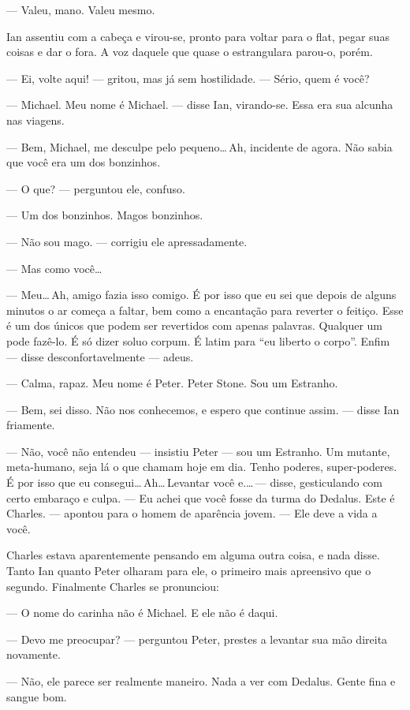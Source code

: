 --- Valeu, mano. Valeu mesmo.

Ian assentiu com a cabeça e virou-se, pronto para voltar para o flat,
pegar suas coisas e dar o fora. A voz daquele que quase o estrangulara
parou-o, porém.

--- Ei, volte aqui! --- gritou, mas já sem hostilidade. --- Sério, quem
é você?

--- Michael. Meu nome é Michael. --- disse Ian, virando-se. Essa era sua
alcunha nas viagens.

--- Bem, Michael, me desculpe pelo pequeno\ldots\,Ah, incidente de
agora. Não sabia que você era um dos bonzinhos.

--- O que? --- perguntou ele, confuso.

--- Um dos bonzinhos. Magos bonzinhos.

--- Não sou mago. --- corrigiu ele apressadamente.

--- Mas como você\ldots

--- Meu\ldots\,Ah, amigo fazia isso comigo. É por isso que eu sei que
depois de alguns minutos o ar começa a faltar, bem como a encantação
para reverter o feitiço. Esse é um dos únicos que podem ser revertidos
com apenas palavras. Qualquer um pode fazê-lo. É só dizer soluo corpum.
É latim para “eu liberto o corpo”. Enfim --- disse desconfortavelmente
--- adeus.

--- Calma, rapaz. Meu nome é Peter. Peter Stone. Sou um Estranho.

--- Bem, sei disso. Não nos conhecemos, e espero que continue assim. ---
disse Ian friamente.

--- Não, você não entendeu --- insistiu Peter --- sou um Estranho. Um
mutante, meta-humano, seja lá o que chamam hoje em dia. Tenho poderes,
super-poderes. É por isso que eu consegui\ldots\,Ah\ldots\,Levantar você
e.\ldots\,--- disse, gesticulando com certo embaraço e culpa. --- Eu
achei que você fosse da turma do Dedalus. Este é Charles. --- apontou
para o homem de aparência jovem. --- Ele deve a vida a você.

Charles estava aparentemente pensando em alguma outra coisa, e nada
disse. Tanto Ian quanto Peter olharam para ele, o primeiro mais
apreensivo que o segundo. Finalmente Charles se pronunciou:

--- O nome do carinha não é Michael. E ele não é daqui.

--- Devo me preocupar? --- perguntou Peter, prestes a levantar sua mão
direita novamente.

--- Não, ele parece ser realmente maneiro. Nada a ver com Dedalus. Gente
fina e sangue bom.

